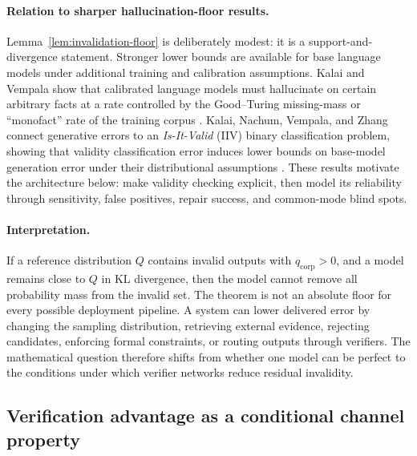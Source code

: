 \documentclass[12pt]{article}
\theoremstyle{definition}
\begin{document}
\paragraph{Relation to sharper hallucination-floor results.}
Lemma~\ref{lem:invalidation-floor} is deliberately modest: it is a
support-and-divergence statement.  Stronger lower bounds are available for base
language models under additional training and calibration assumptions.  Kalai
and Vempala show that calibrated language models must hallucinate on certain
arbitrary facts at a rate controlled by the Good--Turing missing-mass or
``monofact'' rate of the training corpus \parencite{kalai2024calibrated}.
Kalai, Nachum, Vempala, and Zhang connect generative errors to an
\emph{Is-It-Valid} (IIV) binary classification problem, showing that validity
classification error induces lower bounds on base-model generation error under
their distributional assumptions \parencite{kalai2025why}.  These results
motivate the architecture below: make validity checking explicit, then model its
reliability through sensitivity, false positives, repair success, and
common-mode blind spots.

\paragraph{Interpretation.}
If a reference distribution $Q$ contains invalid outputs with
$q_{\mathrm{corp}}>0$, and a model remains close to $Q$ in KL divergence, then
the model cannot remove all probability mass from the invalid set.  The theorem
is not an absolute floor for every possible deployment pipeline.  A system can
lower delivered error by changing the sampling distribution, retrieving external
evidence, rejecting candidates, enforcing formal constraints, or routing outputs
through verifiers.  The mathematical question therefore shifts from whether one
model can be perfect to the conditions under which verifier networks reduce
residual invalidity.

\subsection{Verification advantage as a conditional channel property}
\label{sec:verification-advantage}
\end{document}
